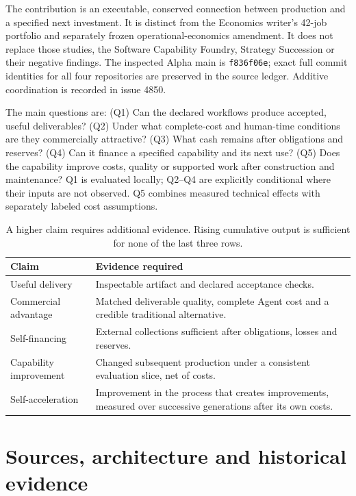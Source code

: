 \documentclass[11pt,a4paper]{article}
\newcommand{\code}[1]{\texttt{\small #1}}
\begin{document}
The contribution is an executable, conserved connection between production and a specified next investment. It is distinct from the Economics writer's 42-job portfolio and separately frozen operational-economics amendment. It does not replace those studies, the Software Capability Foundry, Strategy Succession or their negative findings. The inspected Alpha main is \code{f836f06e}; exact full commit identities for all four repositories are preserved in the source ledger. Additive coordination is recorded in issue 4850.\citep{alpha_source,coordination}

The main questions are: (Q1) Can the declared workflows produce accepted, useful deliverables? (Q2) Under what complete-cost and human-time conditions are they commercially attractive? (Q3) What cash remains after obligations and reserves? (Q4) Can it finance a specified capability and its next use? (Q5) Does the capability improve costs, quality or supported work after construction and maintenance? Q1 is evaluated locally; Q2--Q4 are explicitly conditional where their inputs are not observed. Q5 combines measured technical effects with separately labeled cost assumptions.

\begin{table}[H]\small\centering
\begin{tabularx}{\linewidth}{p{.23\linewidth}X}
\toprule Claim & Evidence required \\\midrule
Useful delivery & Inspectable artifact and declared acceptance checks. \\
Commercial advantage & Matched deliverable quality, complete Agent cost and a credible traditional alternative. \\
Self-financing & External collections sufficient after obligations, losses and reserves. \\
Capability improvement & Changed subsequent production under a consistent evaluation slice, net of costs. \\
Self-acceleration & Improvement in the process that creates improvements, measured over successive generations after its own costs. \\\bottomrule
\end{tabularx}
\caption{A higher claim requires additional evidence. Rising cumulative output is sufficient for none of the last three rows.}
\end{table}

\section{Sources, architecture and historical evidence}
\label{sec:architecture}
\end{document}
